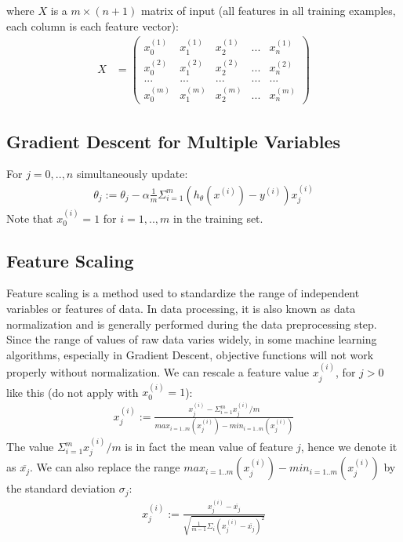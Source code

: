 where $X$ is a $m \times (n+1)$ matrix of input (all features in all training examples, each column is each feature vector):
\begin{align} \label{form:matX}
X &= \begin{pmatrix}
x_0^{(1)} & x_1^{(1)} & x_2^{(1)} & ... & x_n^{(1)} \\
x_0^{(2)} & x_1^{(2)} & x_2^{(2)} & ... & x_n^{(2)} \\
...       & ...       & ...       & ... & ...\\
x_0^{(m)} & x_1^{(m)} & x_2^{(m)} & ... & x_n^{(m)}
\end{pmatrix}
\end{align}

\subsection{Gradient Descent for Multiple Variables}
For $j = 0,..,n $ simultaneously update:
\begin{align}
\label{form:w2mulVarGradDesc}
\theta_j := \theta_j - \alpha \frac{1}{m} \Sigma_{i=1}^{m} (h_{\theta}(x^{(i)}) - y^{(i)})x_j^{(i)}  
\end{align}
Note that $x_0^{(i)} = 1$ for $i = 1,..,m$ in the training set.

\subsection{Feature Scaling}
Feature scaling is a method used to standardize the range of independent variables or features of data. In data processing, it is also known as data normalization and is generally performed during the data preprocessing step. Since the range of values of raw data varies widely, in some machine learning algorithms, especially in Gradient Descent, objective functions will not work properly without normalization. We can rescale a feature value $x_j^{(i)}$, for $j > 0$ like this (do not apply with $x_0^{(i)} = 1$):
\begin{align}
x_j^{(i)} := \frac{x_j^{(i)} - \Sigma_{i=1}^{m} x_j^{(i)}/m}{max_{i=1..m}(x_j^{(i)}) - min_{i=1..m}(x_j^{(i)})} 
\end{align}
The value $\Sigma_{i=1}^{m} x_j^{(i)}/m$ is in fact the mean value of feature $j$, hence we denote it as $\overline{x_j}$. We can also replace the range $max_{i=1..m}(x_j^{(i)}) - min_{i=1..m}(x_j^{(i)})$ by the standard deviation $\sigma_j$:
\begin{align} \label{form:w2FeatScale}
x_j^{(i)} := \frac{x_j^{(i)} - \overline{x_j}}{\sqrt{\frac{1}{m-1}\Sigma_i(x_j^{(i)} - \overline{x_j})^2}} 
\end{align}

